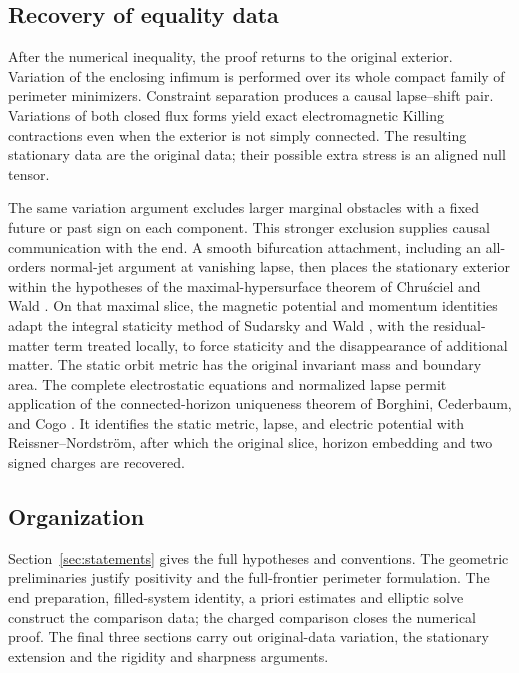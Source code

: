 \subsection{Recovery of equality data}

After the numerical inequality, the proof returns to the original
exterior. Variation of the enclosing infimum is performed over its whole
compact family of perimeter minimizers. Constraint separation produces a
causal lapse--shift pair. Variations of both closed flux forms yield exact
electromagnetic Killing contractions even when the exterior is not
simply connected. The resulting stationary data are the original data;
their possible extra stress is an aligned null tensor.

The same variation argument excludes larger marginal obstacles with a
fixed future or past sign on each component. This stronger exclusion
supplies causal communication with the end. A smooth bifurcation
attachment, including an all-orders normal-jet argument at vanishing
lapse, then places the stationary exterior within the hypotheses of the
maximal-hypersurface theorem of Chru\'sciel and Wald
\cite{ChruscielWald1994}. On that maximal slice, the magnetic potential and
momentum identities adapt the integral staticity method of Sudarsky and
Wald \cite{SudarskyWald1993}, with the residual-matter term treated locally,
to force staticity and the disappearance of additional matter. The static
orbit metric has the original invariant mass and boundary area.
The complete electrostatic equations and normalized lapse permit
application of the connected-horizon uniqueness theorem of Borghini,
Cederbaum, and Cogo \cite[Theorem~3.1]{BorghiniCederbaumCogo2025}.
It identifies the static metric, lapse, and electric potential with
Reissner--Nordstr\"om, after which the original slice, horizon embedding
and two signed charges are recovered.

\subsection{Organization}

Section~\ref{sec:statements} gives the full hypotheses and conventions.
The geometric preliminaries justify positivity and the full-frontier
perimeter formulation. The end preparation, filled-system identity,
a priori estimates and elliptic solve construct the comparison data;
the charged comparison closes the numerical proof. The final three
sections carry out original-data variation, the stationary extension and
the rigidity and sharpness arguments.
